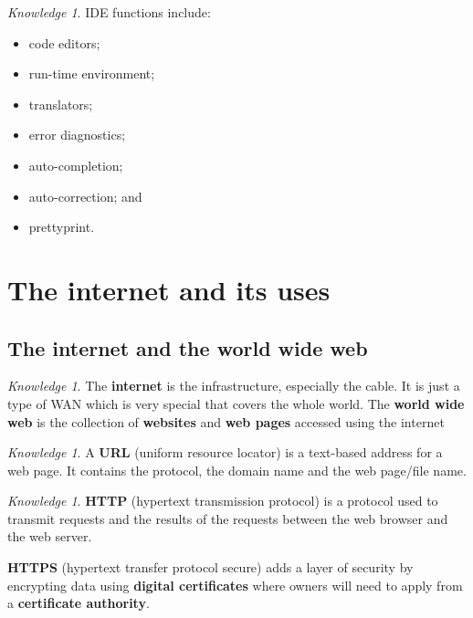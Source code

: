 \documentclass[8pt]{article}
\theoremstyle{remark}
\newtheorem{knowledge}[method]{Knowledge}
\begin{document}
            \begin{knowledge}
                IDE functions include:
                \begin{itemize}
                    \item code editors;
                    \item run-time environment;
                    \item translators;
                    \item error diagnostics;
                    \item auto-completion;
                    \item auto-correction; and
                    \item prettyprint.
                \end{itemize}
            \end{knowledge}

    \section{The internet and its uses}
        
        \subsection{The internet and the world wide web}

            \begin{knowledge}
                The \textbf{internet} is the infrastructure, especially the cable. It is just a type of WAN which is very special that covers the whole world. The \textbf{world wide web} is the collection of \textbf{websites} and \textbf{web pages} accessed using the internet
            \end{knowledge}

            \begin{knowledge}
                A \textbf{URL} (uniform resource locator) is a text-based address for a web page. It contains the protocol, the domain name and the web page/file name.
            \end{knowledge}

            \begin{knowledge}
                \textbf{HTTP} (hypertext transmission protocol) is a protocol used to transmit requests and the results of the requests between the web browser and the web server.
                
                \textbf{HTTPS} (hypertext transfer protocol secure) adds a layer of security by encrypting data using \textbf{digital certificates} where owners will need to apply from a \textbf{certificate authority}.
            \end{knowledge}
\end{document}
